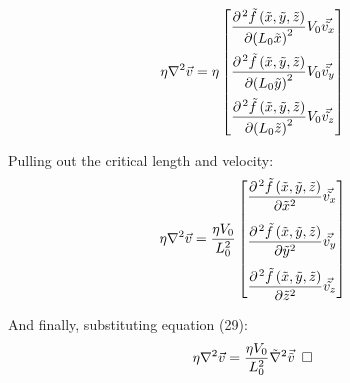 \documentclass[titlepage]{article}
\begin{document}
    \begin{align}
        \eta\nabla^2\vec{v} &={\eta}\begin{bmatrix}
            \displaystyle\frac{\partial^{\hspace*{1pt}2}{\tilde{f}\left(\tilde{x},\tilde{y},\tilde{z}\right)}}{\partial{\left(L_{0}\tilde{x}\right)^{2}}}{V_{0}}\vec{\tilde{v_{x}}} \\[0.45cm]
            \displaystyle\frac{\partial^{\hspace*{1pt}2}{\tilde{f}\left(\tilde{x},\tilde{y},\tilde{z}\right)}}{\partial{\left(L_{0}\tilde{y}\right)^{2}}}{V_{0}}\vec{\tilde{v_{y}}}  \\[0.45cm]
            \displaystyle\frac{\partial^{\hspace*{1pt}2}{\tilde{f}\left(\tilde{x},\tilde{y},\tilde{z}\right)}}{\partial{\left(L_{0}\tilde{z}\right)^{2}}}{V_{0}}\vec{\tilde{v_{z}}}
        \end{bmatrix} 
    \end{align}

    \noindent Pulling out the critical length and velocity:
    \begin{align}
        \eta\nabla^2\vec{v} &= \displaystyle\frac{\eta{V_{0}}}{L_{0}^2}\begin{bmatrix}
            \displaystyle\frac{\partial^{\hspace*{1pt}2}{\tilde{f}\left(\tilde{x},\tilde{y},\tilde{z}\right)}}{\partial{\tilde{x}^{2}}}\vec{\tilde{v_{x}}} \\[0.45cm]
            \displaystyle\frac{\partial^{\hspace*{1pt}2}{\tilde{f}\left(\tilde{x},\tilde{y},\tilde{z}\right)}}{\partial{\tilde{y}^{2}}}\vec{\tilde{v_{y}}}  \\[0.45cm]
            \displaystyle\frac{\partial^{\hspace*{1pt}2}{\tilde{f}\left(\tilde{x},\tilde{y},\tilde{z}\right)}}{\partial{\tilde{z}^{2}}}\vec{\tilde{v_{z}}}
        \end{bmatrix}
    \end{align}

    \noindent And finally, substituting equation (29): 
    \begin{align}
        \eta\nabla^2\vec{v} &= \displaystyle\frac{\eta{V_{0}}}{L_{0}^2}\tilde{\nabla}^2\vec{\tilde{v}}\hspace*{5pt}\square
    \end{align}  \\  \\
\end{document}
